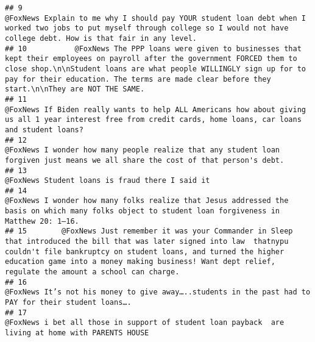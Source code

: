 \documentclass[
]{article}
\begin{document}
\begin{verbatim}
## 9                                                                                                                     @FoxNews Explain to me why I should pay YOUR student loan debt when I worked two jobs to put myself through college so I would not have college debt. How is that fair in any level.
## 10           @FoxNews The PPP loans were given to businesses that kept their employees on payroll after the government FORCED them to close shop.\n\nStudent loans are what people WILLINGLY sign up for to pay for their education. The terms are made clear before they start.\n\nThey are NOT THE SAME.
## 11                                                                                                                                           @FoxNews If Biden really wants to help ALL Americans how about giving us all 1 year interest free from credit cards, home loans, car loans and student loans?
## 12                                                                                                                                                                        @FoxNews I wonder how many people realize that any student loan forgiven just means we all share the cost of that person's debt.
## 13                                                                                                                                                                                                                                                         @FoxNews Student loans is fraud there I said it
## 14                                                                                                                                                     @FoxNews I wonder how many folks realize that Jesus addressed the basis on which many folks object to student loan forgiveness in Matthew 20: 1–16.
## 15        @FoxNews Just remember it was your Commander in Sleep that introduced the bill that was later signed into law  thatnypu couldn't file bankruptcy on student loans, and turned the higher education game into a money making business! Want dept relief, regulate the amount a school can charge.
## 16                                                                                                                                                                                                    @FoxNews It’s not his money to give away…..students in the past had to PAY for their student loans….
## 17                                                                                                                                                                                                      @FoxNews i bet all those in support of student loan payback  are living at home with PARENTS HOUSE

\end{verbatim}
\end{document}
